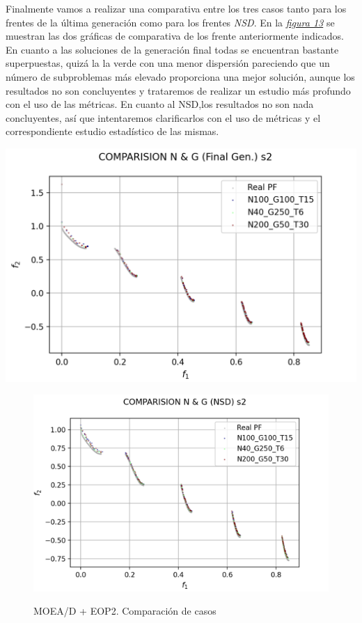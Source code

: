 Finalmente vamos a realizar una comparativa entre los tres casos tanto para los frentes de la última generación como para los frentes \textit{NSD}. En la \hyperref[fig:13]{\textit{figura 13}} se muestran las dos gráficas de comparativa de los frente anteriormente indicados. En cuanto a las soluciones de la generación final todas se encuentran bastante superpuestas, quizá la la verde con una menor dispersión pareciendo que un número de subproblemas más elevado proporciona una mejor solución, aunque los resultados no son concluyentes y trataremos de realizar un estudio más profundo con el uso de las métricas. En cuanto al NSD,los resultados no son nada concluyentes, así que intentaremos clarificarlos con el uso de métricas y el correspondiente estudio estadístico de las mismas.\\ 

\begin{center}
\includegraphics[scale=0.8]{figures/COMPARISIONS_EOP2/GCOMP_FGEN_s2.png}\\
\end{center}
\begin{figure}[H]
\centering
\includegraphics[scale=0.8]{figures/COMPARISIONS_EOP2/GCOMP_NDS_s2.png}\\
\caption{MOEA/D + EOP2. Comparación de casos}
\label{fig:13}
\end{figure}



